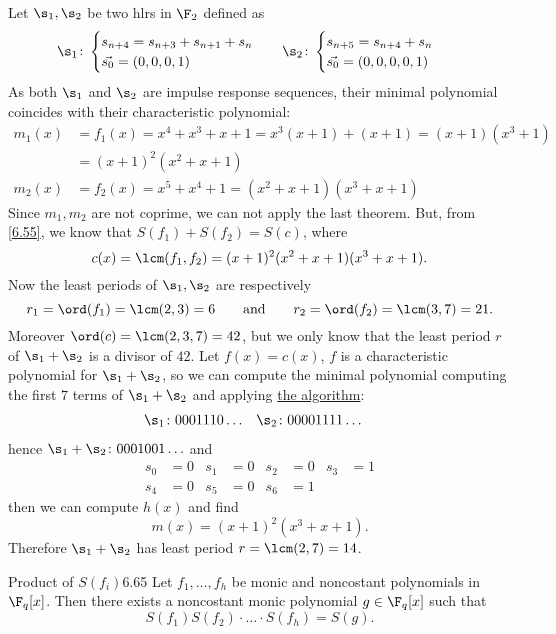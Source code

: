 \begin{ese}
	Let \(\s_1,\s_2\) be two hlrs in \(\F_2\) defined as
	\begin{align*}
		\s_1 & \colon
		\begin{cases}
			s_{n+4}=s_{n+3}+s_{n+1}+s_n \\
			\vec{s_0}=(0,0,0,1)
		\end{cases}
		     & 
		\s_2 & \colon
		\begin{cases}
			s_{n+5}=s_{n+4}+s_n \\
			\vec{s_0}=(0,0,0,0,1)
		\end{cases}
	\end{align*}
	As both \(\s_1\) and \(\s_2\) are impulse response sequences, their minimal polynomial coincides with their characteristic polynomial:
	\begin{align*}
		m_1(x) & = f_1(x) = x^4+x^3+x+1 = x^3(x+1) + (x+1) = (x+1)(x^3+1) \\
		       & = (x+1)^2(x^2+x+1)                                       \\
		m_2(x) & = f_2(x) = x^5+x^4+1 = (x^2+x+1)(x^3+x+1)
	\end{align*}
	Since \(m_1,m_2\) are not coprime, we can not apply the last theorem. But, from \autoref{6.55}, we know that \(S(f_1)+S(f_2)=S(c)\), where
	\[
		c(x) = \lcm(f_1,f_2) = (x+1)^2(x^2+x+1)(x^3+x+1).
	\]
	Now the least periods of \(\s_1,\s_2\) are respectively
	\[
		r_1 = \ord(f_1) = \lcm(2,3) = 6 \qquad\text{and}\qquad r_2 = \ord(f_2) = \lcm(3,7) = 21.
	\]
	Moreover \(\ord(c)=\lcm(2,3,7)=42\), but we only know that the least period \(r\) of \(\s_1+\s_2\) is a divisor of \(42\).
	Let \(f(x)=c(x)\), \(f\) is a characteristic polynomial for \(\s_1+\s_2\), so we can compute the minimal polynomial computing the first \(7\) terms of \(\s_1+\s_2\) and applying \hyperref[minAlg]{the algorithm}:
	\begin{align*}
		\s_1 & \colon 0001110 \ldots & \s_2 & \colon 00001111 \ldots
	\end{align*}
	hence \(\s_1+\s_2\colon 0001001 \ldots\) and
	\begin{align*}
		s_0 & = 0 & s_1 & = 0 & s_2 & = 0  & s_3 & = 1 \\
		s_4 & = 0 & s_5 & = 0 & s_6 & = 1
	\end{align*}
	then we can compute \(h(x)\) and find 
	\[
		m(x) = (x+1)^2(x^3+x+1).
	\]
	Therefore \(\s_1+\s_2\) has least period \(r=\lcm(2,7)=14\). 
\end{ese}
%
%
\begin{teor}{Product of \(S(f_i)\)}{6.65}
	Let \(f_1,\ldots,f_h\) be monic and noncostant polynomials in \(\F_q[x]\). Then there exists a noncostant monic polynomial \(g\in\F_q[x]\) such that
	\[
		S(f_1)S(f_2) \cdot\ldots\cdot S(f_h) = S(g).
	\]
\end{teor}

